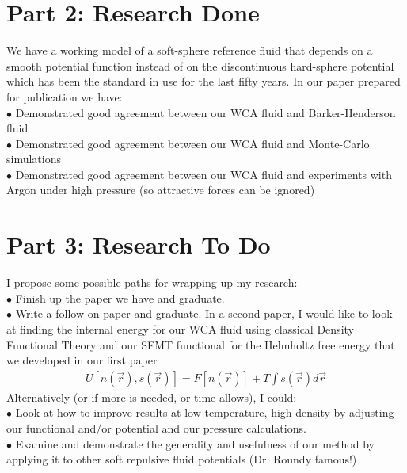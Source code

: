 \documentclass[double,12pt]{revtex4-2}
\begin{document}
\section{Part 2: Research Done}
We have a working model of a soft-sphere reference fluid that depends 
on a smooth potential function instead of on the discontinuous hard-sphere potential 
which has been the standard in use for the last fifty years. 
In our paper prepared for publication we have: \\
$\bullet$ Demonstrated good agreement between our WCA fluid and Barker-Henderson fluid \\
$\bullet$ Demonstrated good agreement between our WCA fluid and Monte-Carlo simulations \\
$\bullet$ Demonstrated good agreement between our WCA fluid and experiments with Argon under high pressure (so attractive forces can be ignored) \\

\section{Part 3: Research To Do}
\noindent %
I propose some possible paths for wrapping up my research: \\
$\bullet$ Finish up the paper we have and graduate. \\
$\bullet$ Write a follow-on paper and graduate. In a second paper, I would 
like to look at finding the internal energy for our WCA fluid using 
classical Density Functional Theory and our SFMT functional 
for the Helmholtz free energy that we developed in our first paper 
\begin{align}
  U[n(\vec r), s(\vec r)] = F[n(\vec r)] + T\int s(\vec r) d\vec r
\end{align}
 Alternatively (or if more is needed, or time allows), I could: \\
$\bullet$ Look at how to improve results at low temperature, high density 
by adjusting our functional and/or potential and our pressure calculations.\\ %
$\bullet$ Examine and demonstrate the generality and usefulness of our 
method by applying it to other soft repulsive fluid potentials (Dr. Roundy famous!) \\
\end{document}
